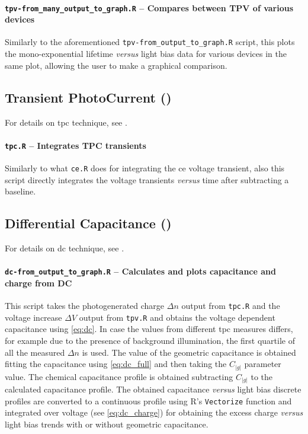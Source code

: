		\paragraph{\texttt{tpv-\-from\_many\_output\_to\_graph.R} -- Compares between TPV of various devices}
		Similarly to the aforementioned \texttt{tpv-\-from\_output\_to\_graph.R} script, this plots the mono\hyp{}exponential lifetime \textsl{versus} light bias data for various devices in the same plot, allowing the user to make a graphical comparison.
%
	\subsection{Transient PhotoCurrent ()}\label{r_tpc}
	For details on \gls{tpc} technique, see .

		\paragraph{\texttt{tpc.R} -- Integrates TPC transients}
		Similarly to what \texttt{ce.R} does for integrating the \gls{ce} voltage transient, also this script directly integrates the voltage transients \textsl{versus} time after subtracting a baseline.
		
%
%
	\subsection{Differential Capacitance ()}\label{r_dc}
	For details on \gls{dc} technique, see .

		\paragraph{\texttt{dc-\-from\_output\_to\_graph.R} -- Calculates and plots capacitance and charge from DC}
		This script takes the photogenerated charge $\Delta n$ output from \texttt{tpc.R} and the voltage increase $\Delta V$ output from \texttt{tpv.R} and obtains the voltage dependent capacitance using \cref{eq:dc}.
		In case the values from different \gls{tpc} measures differs, for example due to the presence of background illumination, the first quartile of all the measured $\Delta n$ is used.
		The value of the geometric capacitance is obtained fitting the capacitance using \cref{eq:dc_full} and then taking the $C_|g|$ parameter value.
		The chemical capacitance profile is obtained subtracting $C_|g|$ to the calculated capacitance profile.
		The obtained capacitance \textsl{versus} light bias discrete profiles are converted to a continuous profile using R's \texttt{Vectorize} function and integrated over voltage (see \cref{eq:dc_charge}) for obtaining the excess charge \textsl{versus} light bias trends with or without geometric capacitance.

